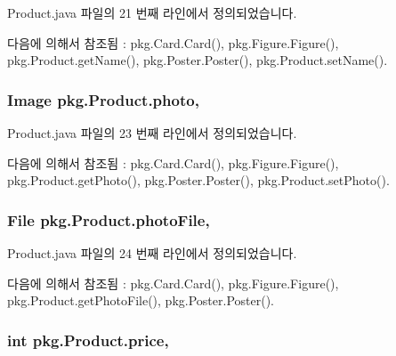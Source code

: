 Product.\+java 파일의 21 번째 라인에서 정의되었습니다.



다음에 의해서 참조됨 \+:  pkg.\+Card.\+Card(), pkg.\+Figure.\+Figure(), pkg.\+Product.\+get\+Name(), pkg.\+Poster.\+Poster(), pkg.\+Product.\+set\+Name().

\subsubsection[{\texorpdfstring{photo}{photo}}]{\setlength{\rightskip}{0pt plus 5cm}Image pkg.\+Product.\+photo\hspace{0.3cm}{\ttfamily [protected]}, {\ttfamily [inherited]}}\hypertarget{classpkg_1_1_product_a5d279eb4556860b90305cc26a3ee69be}{}\label{classpkg_1_1_product_a5d279eb4556860b90305cc26a3ee69be}


Product.\+java 파일의 23 번째 라인에서 정의되었습니다.



다음에 의해서 참조됨 \+:  pkg.\+Card.\+Card(), pkg.\+Figure.\+Figure(), pkg.\+Product.\+get\+Photo(), pkg.\+Poster.\+Poster(), pkg.\+Product.\+set\+Photo().

\subsubsection[{\texorpdfstring{photo\+File}{photoFile}}]{\setlength{\rightskip}{0pt plus 5cm}File pkg.\+Product.\+photo\+File\hspace{0.3cm}{\ttfamily [protected]}, {\ttfamily [inherited]}}\hypertarget{classpkg_1_1_product_a2eeaba74c302ecdc9dd288ff7527ac67}{}\label{classpkg_1_1_product_a2eeaba74c302ecdc9dd288ff7527ac67}


Product.\+java 파일의 24 번째 라인에서 정의되었습니다.



다음에 의해서 참조됨 \+:  pkg.\+Card.\+Card(), pkg.\+Figure.\+Figure(), pkg.\+Product.\+get\+Photo\+File(), pkg.\+Poster.\+Poster().

\subsubsection[{\texorpdfstring{price}{price}}]{\setlength{\rightskip}{0pt plus 5cm}int pkg.\+Product.\+price\hspace{0.3cm}{\ttfamily [protected]}, {\ttfamily [inherited]}}\hypertarget{classpkg_1_1_product_a46c6eb6906d4ee2f6393515f41dba7c9}{}\label{classpkg_1_1_product_a46c6eb6906d4ee2f6393515f41dba7c9}


